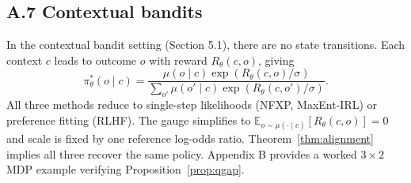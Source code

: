 \subsection*{A.7 Contextual bandits}
In the contextual bandit setting (Section 5.1), there are no state transitions. Each context $c$ leads to outcome $o$ with reward $R_\theta(c,o)$, giving
\[
\pi^{\ast}_\theta(o\mid c)=\frac{\mu(o\mid c)\exp(R_\theta(c,o)/\sigma)}{\sum_{o'}\mu(o'\mid c)\exp(R_\theta(c,o')/\sigma)}.
\]
All three methods reduce to single-step likelihoods (NFXP, MaxEnt-IRL) or preference fitting (RLHF). The gauge simplifies to $\mathbb E_{o\sim\mu(\cdot\mid c)}[R_\theta(c,o)]=0$ and scale is fixed by one reference log-odds ratio. Theorem~\ref{thm:alignment} implies all three recover the same policy. Appendix B provides a worked $3\times 2$ MDP example verifying Proposition~\ref{prop:qgap}.
